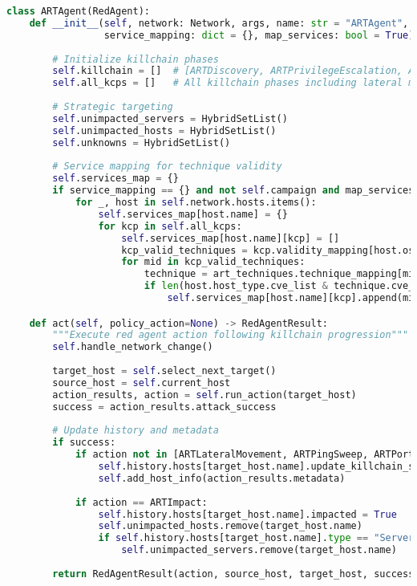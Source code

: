 \documentclass[12pt,a4paper]{article}
\begin{document}
\begin{lstlisting}[language=Python, caption=ART Agent Core Logic]
class ARTAgent(RedAgent):
    def __init__(self, network: Network, args, name: str = "ARTAgent", 
                 service_mapping: dict = {}, map_services: bool = True):
        
        # Initialize killchain phases
        self.killchain = []  # [ARTDiscovery, ARTPrivilegeEscalation, ARTImpact]
        self.all_kcps = []   # All killchain phases including lateral movement
        
        # Strategic targeting
        self.unimpacted_servers = HybridSetList()
        self.unimpacted_hosts = HybridSetList()
        self.unknowns = HybridSetList()
        
        # Service mapping for technique validity
        self.services_map = {}
        if service_mapping == {} and not self.campaign and map_services:
            for _, host in self.network.hosts.items():
                self.services_map[host.name] = {}
                for kcp in self.all_kcps:
                    self.services_map[host.name][kcp] = []
                    kcp_valid_techniques = kcp.validity_mapping[host.os][kcp.get_name()]
                    for mid in kcp_valid_techniques:
                        technique = art_techniques.technique_mapping[mid]
                        if len(host.host_type.cve_list & technique.cve_list) > 0:
                            self.services_map[host.name][kcp].append(mid)

    def act(self, policy_action=None) -> RedAgentResult:
        """Execute red agent action following killchain progression"""
        self.handle_network_change()
        
        target_host = self.select_next_target()
        source_host = self.current_host
        action_results, action = self.run_action(target_host)
        success = action_results.attack_success
        
        # Update history and metadata
        if success:
            if action not in [ARTLateralMovement, ARTPingSweep, ARTPortScan, Nothing]:
                self.history.hosts[target_host.name].update_killchain_step()
                self.add_host_info(action_results.metadata)
            
            if action == ARTImpact:
                self.history.hosts[target_host.name].impacted = True
                self.unimpacted_hosts.remove(target_host.name)
                if self.history.hosts[target_host.name].type == "Server":
                    self.unimpacted_servers.remove(target_host.name)
        
        return RedAgentResult(action, source_host, target_host, success, action_results=action_results)
\end{lstlisting}
\end{document}
